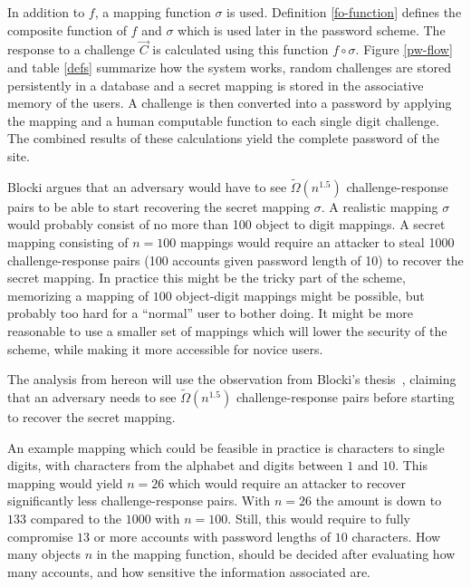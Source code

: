 \par In addition to $f$, a mapping function $\sigma$ is used. Definition \ref{fo-function} defines the composite function of $f$ and $\sigma$ which is used later in the password scheme. The response to a challenge $\vec C$ is calculated using this function $f \circ \sigma$. Figure \ref{pw-flow} and table \ref{defs} summarize how the system works, random challenges are stored persistently in a database and a secret mapping is stored in the associative memory of the users. A challenge is then converted into a password by applying the mapping and a human computable function to each single digit challenge. The combined results of these calculations yield the complete password of the site.
\par Blocki argues that an adversary would have to see $\tilde \Omega(n^{1.5})$ challenge-response pairs to be able to start recovering the secret mapping $\sigma$. A realistic mapping $\sigma$ would probably consist of no more than 100 object to digit mappings. A secret mapping consisting of $n=100$ mappings would require an attacker to steal 1000 challenge-response pairs (100 accounts given password length of 10) to recover the secret mapping. In practice this might be the tricky part of the scheme, memorizing a mapping of $100$ object-digit mappings might be possible, but probably too hard for a ``normal'' user to bother doing. It might be more reasonable to use a smaller set of mappings which will lower the security of the scheme, while making it more accessible for novice users. 
\begin{remark}\label{startrecover}
    The analysis from hereon will use the observation from Blocki's thesis~\cite{Blocki2014}, claiming that an adversary needs to see $\tilde \Omega(n^{1.5})$ challenge-response pairs before starting to recover the secret mapping.
\end{remark}
\par An example mapping which could be feasible in practice is characters to single digits, with characters from the alphabet and digits between $1$ and $10$. This mapping would yield $n=26$ which would require an attacker to recover significantly less challenge-response pairs. With $n=26$ the amount is down to $133$ compared to the $1000$ with $n=100$. Still, this would require to fully compromise $13$ or more accounts with password lengths of $10$ characters. How many objects $n$ in the mapping function, should be decided after evaluating how many accounts, and how sensitive the information associated are.



